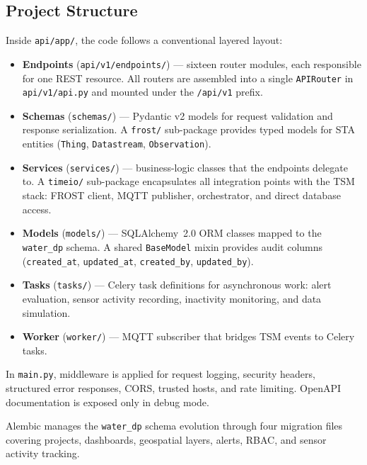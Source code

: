 \subsection{Project Structure}
\label{sec:impl-backend-structure}

Inside \texttt{api/app/}, the code follows a conventional layered layout:

\begin{itemize}
  \item \textbf{Endpoints} (\texttt{api/v1/endpoints/}) --- sixteen router modules, each
        responsible for one REST resource. All routers are assembled into a single
        \texttt{APIRouter} in \texttt{api/v1/api.py} and mounted under the
        \texttt{/api/v1} prefix.
  \item \textbf{Schemas} (\texttt{schemas/}) --- Pydantic v2 models for request validation
        and response serialization. A \texttt{frost/} sub-package provides typed models for
        STA entities (\texttt{Thing}, \texttt{Datastream}, \texttt{Observation}).
  \item \textbf{Services} (\texttt{services/}) --- business-logic classes that the endpoints
        delegate to. A \texttt{timeio/} sub-package encapsulates all integration points with
        the TSM stack: FROST client, MQTT publisher, orchestrator, and direct database access.
  \item \textbf{Models} (\texttt{models/}) --- SQLAlchemy~2.0 ORM classes mapped to the
        \texttt{water\_dp} schema. A shared \texttt{BaseModel} mixin provides audit columns
        (\texttt{created\_at}, \texttt{updated\_at}, \texttt{created\_by},
        \texttt{updated\_by}).
  \item \textbf{Tasks} (\texttt{tasks/}) --- Celery task definitions for asynchronous work:
        alert evaluation, sensor activity recording, inactivity monitoring, and data
        simulation.
  \item \textbf{Worker} (\texttt{worker/}) --- MQTT subscriber that bridges TSM events to
        Celery tasks.
\end{itemize}

In \texttt{main.py}, middleware is applied for request logging, security headers, structured
error responses, CORS, trusted hosts, and rate limiting. OpenAPI documentation is exposed only
in debug mode.

Alembic manages the \texttt{water\_dp} schema evolution through four migration files covering
projects, dashboards, geospatial layers, alerts, RBAC, and sensor activity tracking.

